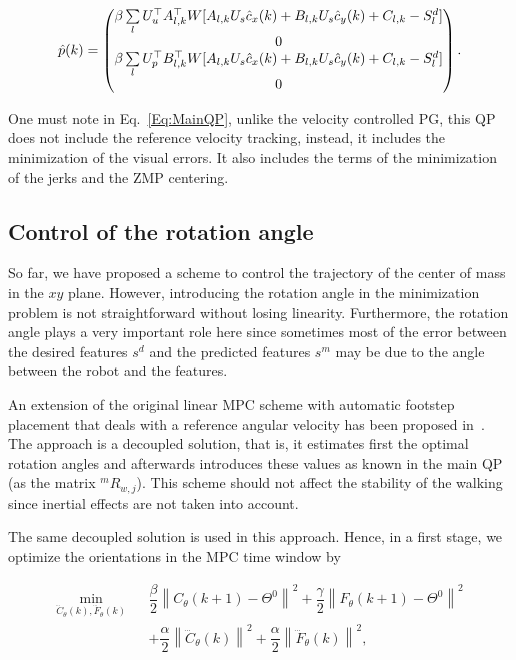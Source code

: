 \begin{equation*}
 \hat{p}(k) = 
 \left(
 \begin{matrix}
 \beta  \sum\limits_l U_{u}^{\top} A_{l,k}^{\top} W [A_{l,k} U_{s} \hat{c}_x(k) + B_{l,k} U_{s} \hat{c}_y(k) + C_{l,k} - S^d_l]\\
 0 \\
 \beta  \sum\limits_l U_{p}^{\top} B_{l,k}^{\top} W [A_{l,k} U_{s} \hat{c}_x(k) + B_{l,k} U_{s} \hat{c}_y(k) + C_{l,k} - S^d_l ]\\
 0
 \end{matrix}
 \right).
\end{equation*}

One must note in Eq.~\ref{Eq:MainQP}, unlike the velocity controlled PG, this QP does not include the reference velocity tracking, instead, it includes the minimization of the visual errors. It also includes the terms of the minimization of the jerks and the ZMP centering.

\subsection{Control of the rotation angle}
\label{subsection:control_of_the_rotation_angle}

So far, we have proposed a scheme to control the trajectory of the center of mass in the $xy$ plane. However, introducing the rotation angle in the minimization problem is not straightforward without losing linearity. Furthermore, the rotation angle plays a very important role here since sometimes most of the error between the desired features $s^d$ and the predicted features $s^m$ may be due to the angle between the robot and the features.

An extension of the original linear MPC scheme with automatic footstep placement that deals with a reference angular velocity has been proposed in~\citep{HerdtIROS2010}. The approach is a decoupled solution, that is, it estimates first the optimal rotation angles and afterwards introduces these values as known in the main QP (as the matrix ${^mR_{w,j}}$). This scheme should not affect the stability of the walking since inertial effects are not taken into account.

The same decoupled solution is used in this approach. Hence, in a first stage, we optimize the orientations in the MPC time window by  

{\small
\begin{eqnarray}
 \min\limits_{\dddot{C}_{\theta}(k),\dddot{F}_{\theta}(k) }  &&  \dfrac{\beta}{2} \left\| C_{\theta}(k+1) - \Theta^{0} \right\|^2 + \dfrac{\gamma}{2} \left\| F_{\theta}(k+1) - \Theta^{0} \right\|^2 \\
\nonumber && + \dfrac{\alpha}{2} \left\| \dddot{C}_{\theta}(k) \right\|^2 + \dfrac{\alpha}{2} \left\| \dddot{F}_{\theta}(k) \right\|^2,
\end{eqnarray}
}

